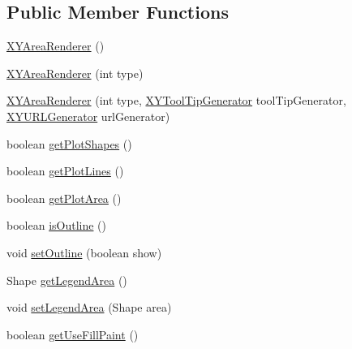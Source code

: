 \subsection*{Public Member Functions}
\begin{DoxyCompactItemize}
\item 
\mbox{\hyperlink{classorg_1_1jfree_1_1chart_1_1renderer_1_1xy_1_1_x_y_area_renderer_a75bfe51ada4bc753d9064b63efd38cb9}{X\+Y\+Area\+Renderer}} ()
\item 
\mbox{\hyperlink{classorg_1_1jfree_1_1chart_1_1renderer_1_1xy_1_1_x_y_area_renderer_a3c9e25cb74c8b43a9ab806582770b372}{X\+Y\+Area\+Renderer}} (int type)
\item 
\mbox{\hyperlink{classorg_1_1jfree_1_1chart_1_1renderer_1_1xy_1_1_x_y_area_renderer_a957fbecd8cf91c9a46b173a1bfcfdd74}{X\+Y\+Area\+Renderer}} (int type, \mbox{\hyperlink{interfaceorg_1_1jfree_1_1chart_1_1labels_1_1_x_y_tool_tip_generator}{X\+Y\+Tool\+Tip\+Generator}} tool\+Tip\+Generator, \mbox{\hyperlink{interfaceorg_1_1jfree_1_1chart_1_1urls_1_1_x_y_u_r_l_generator}{X\+Y\+U\+R\+L\+Generator}} url\+Generator)
\item 
boolean \mbox{\hyperlink{classorg_1_1jfree_1_1chart_1_1renderer_1_1xy_1_1_x_y_area_renderer_a26465f2b04add0425773338dc80677cb}{get\+Plot\+Shapes}} ()
\item 
boolean \mbox{\hyperlink{classorg_1_1jfree_1_1chart_1_1renderer_1_1xy_1_1_x_y_area_renderer_a999cf1505c4e98d85655f7d6fbe05461}{get\+Plot\+Lines}} ()
\item 
boolean \mbox{\hyperlink{classorg_1_1jfree_1_1chart_1_1renderer_1_1xy_1_1_x_y_area_renderer_a3827715712d635ea30cca032bdf620a1}{get\+Plot\+Area}} ()
\item 
boolean \mbox{\hyperlink{classorg_1_1jfree_1_1chart_1_1renderer_1_1xy_1_1_x_y_area_renderer_ac3cc19d734e12c87eca22360c0d1eeea}{is\+Outline}} ()
\item 
void \mbox{\hyperlink{classorg_1_1jfree_1_1chart_1_1renderer_1_1xy_1_1_x_y_area_renderer_aebd1a9e5609ccec9870b084f12b969d1}{set\+Outline}} (boolean show)
\item 
Shape \mbox{\hyperlink{classorg_1_1jfree_1_1chart_1_1renderer_1_1xy_1_1_x_y_area_renderer_a73b6b9409ebc8623d70b5c1de4ad2b4f}{get\+Legend\+Area}} ()
\item 
void \mbox{\hyperlink{classorg_1_1jfree_1_1chart_1_1renderer_1_1xy_1_1_x_y_area_renderer_ab91f50ddd592b2489a2dd26f0de76b42}{set\+Legend\+Area}} (Shape area)
\item 
boolean \mbox{\hyperlink{classorg_1_1jfree_1_1chart_1_1renderer_1_1xy_1_1_x_y_area_renderer_acfb791c80437d7b926d581d0bbe1e44b}{get\+Use\+Fill\+Paint}} ()

\end{DoxyCompactItemize}
